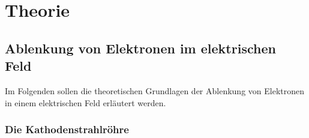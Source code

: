 \section{Theorie}
\label{sec:theorie}

\subsection{Ablenkung von Elektronen im elektrischen Feld}
\label{sec:ablenkung_efeld}

    Im Folgenden sollen die theoretischen Grundlagen der Ablenkung von Elektronen in einem elektrischen Feld erläutert werden.

\subsubsection{Die Kathodenstrahlröhre}
\label{sec:kathodenstrahlröhre}

